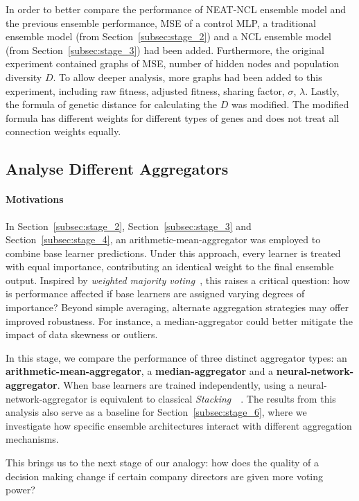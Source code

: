 In order to better compare the performance of NEAT-NCL ensemble model and the previous ensemble performance, MSE of a control MLP, a traditional ensemble model (from Section~\ref{subsec:stage_2}) and a NCL ensemble model (from Section~\ref{subsec:stage_3}) had been added. Furthermore, the original experiment contained graphs of MSE, number of hidden nodes and population diversity $D$. To allow deeper analysis, more graphs had been added to this experiment, including raw fitness, adjusted fitness, sharing factor, $\sigma$, $\lambda$. Lastly, the formula of genetic distance for calculating the $D$ was modified. The modified formula has different weights for different types of genes and does not treat all connection weights equally. 


\subsection{Analyse Different Aggregators}
\label{subsec:stage_5}


\paragraph{Motivations}
In Section~\ref{subsec:stage_2}, Section~\ref{subsec:stage_3} and Section~\ref{subsec:stage_4}, an arithmetic-mean-aggregator was employed to combine base learner predictions. Under this approach, every learner is treated with equal importance, contributing an identical weight to the final ensemble output. Inspired by \textit{weighted majority voting}~\cite{littlestone1994weighted}, this raises a critical question: how is performance affected if base learners are assigned varying degrees of importance? Beyond simple averaging, alternate aggregation strategies may offer improved robustness. For instance, a median-aggregator could better mitigate the impact of data skewness or outliers. 

In this stage, we compare the performance of three distinct aggregator types: an \textbf{arithmetic-mean-aggregator}, a \textbf{median-aggregator} and a \textbf{neural-network-aggregator}. When base learners are trained independently, using a neural-network-aggregator is equivalent to classical \textit{Stacking}~\cite{wolpert1992stacked}~\cite{breiman1996stacked}. The results from this analysis also serve as a baseline for Section~\ref{subsec:stage_6}, where we investigate how specific ensemble architectures interact with different aggregation mechanisms. 

This brings us to the next stage of our analogy: how does the quality of a decision making change if certain company directors are given more voting power? 


